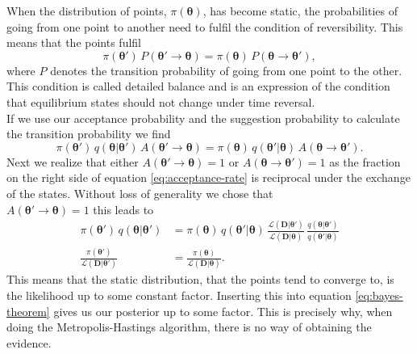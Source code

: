 \documentclass[../main.tex]{subfiles}
\begin{document}
 When the distribution of points, $\pi(\boldsymbol{\theta})$, has become static, the probabilities of going from one point to another need to fulfil the condition of reversibility. This means that the points fulfil \begin{equation}
    \pi(\boldsymbol{\theta}')\, P(\boldsymbol{\theta}'\to\boldsymbol{\theta})= \pi(\boldsymbol{\theta})\,P(\boldsymbol{\theta}\to\boldsymbol{\theta}'),
 \end{equation}
 where $P$ denotes the transition probability of going from one point to the other. This condition is called detailed balance and is an expression of the condition that equilibrium states should not change under time reversal. \\
 If we use our acceptance probability and the suggestion probability to calculate the transition probability we find \begin{equation}
    \pi(\boldsymbol{\theta}')\,q(\boldsymbol{\theta}|\boldsymbol{\theta}')\,A(\boldsymbol{\theta}'\to\boldsymbol{\theta}) = \pi(\boldsymbol{\theta})\,q(\boldsymbol{\theta}'|\boldsymbol{\theta})\,A(\boldsymbol{\theta}\to\boldsymbol{\theta}').
 \end{equation}
 Next we realize that either $A(\boldsymbol{\theta}'\to\boldsymbol{\theta})=1$ or $A(\boldsymbol{\theta}\to\boldsymbol{\theta}')=1$  as the fraction on the right side 
 of equation \ref{eq:acceptance-rate} is reciprocal under the exchange of the states. Without loss of generality we chose that \\$A(\boldsymbol{\theta}'\to\boldsymbol{\theta})=1$ this leads to 
 \begin{align}
    \pi(\boldsymbol{\theta}')\,q(\boldsymbol{\theta}|\boldsymbol{\theta}') &= \pi(\boldsymbol{\theta})\,q(\boldsymbol{\theta}'|\boldsymbol{\theta})\,\frac{\mathcal{L}(\boldsymbol{D}|\boldsymbol{\theta}')}{\mathcal{L}(\boldsymbol{D}|\boldsymbol{\theta})}\,\frac{q(\boldsymbol{\theta}|\boldsymbol{\theta}')}{q(\boldsymbol{\theta}'|\boldsymbol{\theta})} \nonumber \\
    \frac{\pi(\boldsymbol{\theta}')}{\mathcal{L}(\boldsymbol{D}|\boldsymbol{\theta}')} &= \frac{\pi(\boldsymbol{\theta})}{\mathcal{L}(\boldsymbol{D}|\boldsymbol{\theta})}.
 \end{align}
 This means that the static distribution, that the points tend to converge to, is the likelihood up to some constant factor. Inserting this into equation \ref{eq:bayes-theorem} gives us our posterior up to some factor. This is precisely why, when doing the Metropolis-Hastings algorithm, there is no way of obtaining the evidence.\\
\end{document}
